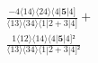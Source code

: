 \documentclass[varwidth, border=5pt]{standalone}
\begin{document}
\begin{my}
$\begin{gathered}
\scriptscriptstyle\frac{-4⟨14⟩⟨24⟩⟨4|𝟓|4]}{⟨13⟩⟨34⟩⟨1|2+3|4]} +\\
\scriptscriptstyle\frac{1⟨12⟩⟨14⟩⟨4|𝟓|4]²}{⟨13⟩⟨34⟩⟨1|2+3|4]²} \phantom{+}
\end{gathered}$
\end{my}
\end{document}
